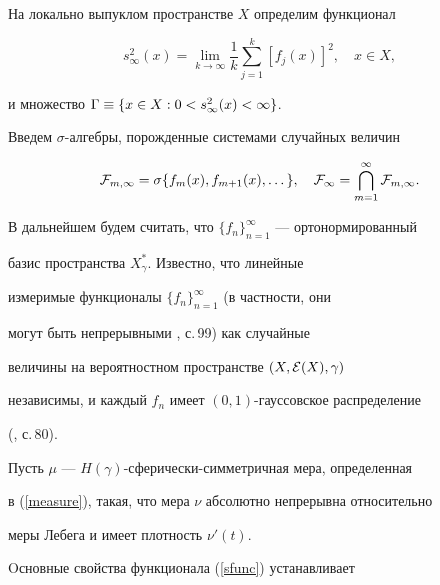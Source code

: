На локально выпуклом пространстве $X$ определим функционал


\begin{equation}


s^2_\infty(x)=\lim_{k\to\infty}\frac1k\sum_{j=1}^k


[f_j(x)]^2,\quad x\in X,


\label{sfunc}


\end{equation}


и множество $\Gamma\equiv\{x\in X:0<s^2_\infty(x)<\infty\}$.


Введем $\sigma$-алгебры, порожденные системами случайных величин


$$


{\cal F}_{m,\infty}=\sigma\{f_m(x),f_{m+1}(x),\dotsc\},\quad


{\cal F}_\infty=\bigcap_{m=1}^\infty{\cal F}_{m,\infty}.


$$


В дальнейшем будем считать, что $\{f_n\}_{n=1}^\infty$ --- ортонормированный


базис пространства $X^*_\gamma$. Известно, что линейные


измеримые функционалы $\{f_n\}_{n=1}^\infty$ (в частности, они


могут быть непрерывными \cite{Bogach}, с.\,99) как случайные


величины на вероятностном пространстве $(X,{\cal E}(X),\gamma)$


независимы, и каждый $f_n$ имеет $(0,1)$-гауссовское распределение


(\cite{Bogach}, с.\,80).


Пусть $\mu$ --- $H(\gamma)$-сфе\-ри\-чес\-ки-симметричная мера, определенная 


в (\ref{measure}), такая, что мера $\nu$ абсолютно непрерывна относительно 


меры Лебега и имеет плотность $\nu'(t)$.





Oсновные свойства функционала (\ref{sfunc}) устанавливает








